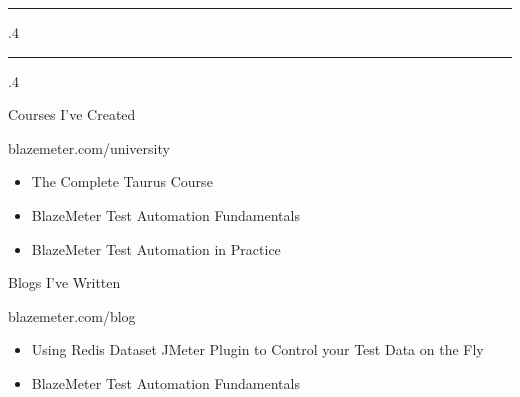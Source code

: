\documentclass[10pt]{article}
\makeatletter
\newcommand*\rulefill[1][.4\p@]{%
    \leavevmode
    \leaders \hrule \@height #1\relax \hfill
    \null
  }
\makeatother
\begin{document}

\begin{minipage}[t]{0.6\linewidth}

\noindent
	\textcolor{black!20}{\rulefill\quad 
			{\fontsize{14}{25}\selectfont \textsl{}}
	\quad\rulefill}
\flushleft

\vspace{.15cm}

	{\fontsize{14}{20}\selectfont \textcolor{black!65}{Courses I've Created}}

\vspace{.1cm}

	{\fontsize{10}{12}\selectfont 
		\textcolor{black!65}{blazemeter.com/university}}

\vspace{-0.75cm}

	{\fontsize{13}{16}\selectfont \textcolor{black!45}{
		\begin{justify}
		    \renewcommand{\labelitemi}{-}
		    \begin{itemize}[leftmargin=*]
		        \setlength\itemsep{-0.25em}
			    \item The Complete Taurus Course
			    \item BlazeMeter Test Automation Fundamentals
			    \item BlazeMeter Test Automation in Practice
			\end{itemize}
		\end{justify}}}

\vspace{.25cm}
	{\fontsize{14}{20}\selectfont \textcolor{black!65}{Blogs I've Written}}

\vspace{.1cm}

	{\fontsize{10}{12}\selectfont 
		\textcolor{black!65}{blazemeter.com/blog}}

\vspace{-0.75cm}

	{\fontsize{13}{16}\selectfont \textcolor{black!45}{
		\begin{justify}
		    \renewcommand{\labelitemi}{-}
		    \begin{itemize}[leftmargin=*]
		        \setlength\itemsep{-0.25em}
			    \item Using Redis Dataset JMeter Plugin to Control your Test Data on the Fly
			    \item BlazeMeter Test Automation Fundamentals
			\end{itemize}
		\end{justify}}}
\end{minipage}
\end{document}

